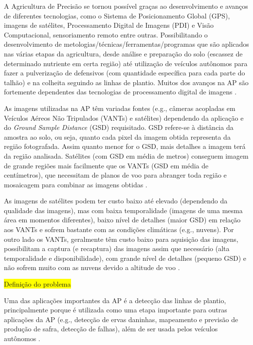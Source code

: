 \documentclass[12pt, a4paper, english, brazil]{article}
\newcommand{\boxYellow}[1]{\colorbox{yellow}{#1}}
\begin{document}
A Agricultura de Precisão se tornou possível graças ao desenvolvimento e avanços de diferentes tecnologias, como o Sistema de Posicionamento Global (GPS), imagens de satélites, Processamento Digital de Imagens (PDI) e Visão Computacional, sensoriamento remoto entre outras. Possibilitando o desenvolvimento de metologias/técnicas/ferramentas/programas que são aplicados nas várias etapas da agricultura, desde análise e preparação do solo (escassez de determinado nutriente em certa região) até utilização de veículos autônomos para fazer a pulverização de defensivos (com quantidade específica para cada parte do talhão) e na colheita seguindo as linhas de plantio. Muitos dos avanços na AP são fortemente dependentes das tecnologias de processamento digital de imagens \cite{Bolfe_2020}.

As imagens utilizadas na AP têm variadas fontes (e.g., câmeras acopladas em Veículos Aéreos Não Tripulados (VANTs) e satélites) dependendo da aplicação e do \textit{Ground Sample Distance} (GSD) requisitado. GSD refere-se à distância da amostra ao solo, ou seja, quanto cada pixel da imagem obtida representa da região fotografada. Assim quanto menor for o GSD, mais detalhes a imagem terá da região analisada. Satélites (com GSD em média de metros) conseguem imagem de grande regiões mais facilmente que os VANTs (GSD em média de centímetros), que necessitam de planos de voo para abranger toda região e mosaicagem para combinar as imagens obtidas \cite{Messina_2020}.

As imagens de satélites podem ter custo baixo até elevado (dependendo da qualidade das imagens), mas com baixa temporalidade (imagens de uma mesma área em momentos diferentes), baixo nível de detalhes (maior GSD) em relação aos VANTs e sofrem bastante com as condições climáticas (e.g., nuvens). Por outro lado os VANTs, geralmente têm custo baixo para aquisição das imagens, possibilitam a captura (e recaptura) das imagens assim que necessário (alta temporalidade e disponibilidade), com grande nível de detalhes (pequeno GSD) e não sofrem muito com as nuvens devido a altitude de voo \cite{Candiago_2015, Delavarpour_2021}.

\boxYellow{Definição do problema}

Uma das aplicações importantes da AP é a detecção das linhas de plantio, principalmente porque é utilizada como uma etapa importante para outras aplicações da AP (e.g., detecção de ervas daninhas, mapeamento e previsão de produção de safra, detecção de falhas), além de ser usada pelos veículos autônomos \cite{Hassanein_2019}.
\end{document}
